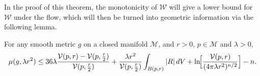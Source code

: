 In the proof of this theorem, the monotonicity of $\mathcal W$ will give a
lower bound for $\mathcal W$ under the flow, which will then be turned into
geometric information via the following lemma.

\begin{lemma}
\label{topping-ch8-mu-ball-bound}
For any smooth metric $g$ on a closed manifold $\mathcal M$, and $r > 0$,
$p \in \mathcal M$ and $\lambda > 0$,
\[
\mu(g,\lambda r^2) \le 36\lambda \frac{\mathcal V(p,r) - \mathcal V(p,\frac r2)}{\mathcal V(p,\frac r2)}
+ \frac{\lambda r^2}{\mathcal V(p,\frac r2)} \int_{B(p,r)} |R|\,dV + \ln\!\Bigl[\frac{\mathcal V(p,r)}{(4\pi \lambda r^2)^{n/2}}\Bigr] - n.
\]
\end{lemma}

